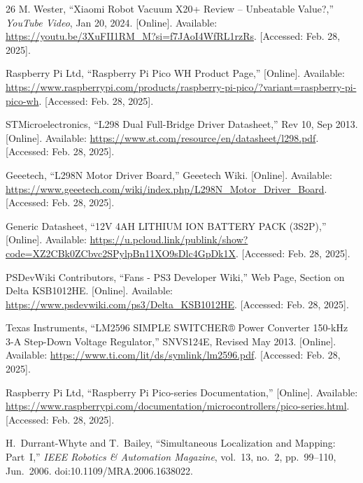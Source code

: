 \begin{thebibliography}{26}
M. Wester, ``Xiaomi Robot Vacuum X20+ Review -- Unbeatable Value?,'' \textit{YouTube Video}, Jan 20, 2024. [Online]. Available: \url{https://youtu.be/3XuFII1RM_M?si=f7JAoI4WfRL1rzRs}. [Accessed: Feb. 28, 2025].

Raspberry Pi Ltd, ``Raspberry Pi Pico WH Product Page,'' [Online]. Available: \url{https://www.raspberrypi.com/products/raspberry-pi-pico/?variant=raspberry-pi-pico-wh}. [Accessed: Feb. 28, 2025].

STMicroelectronics, ``L298 Dual Full-Bridge Driver Datasheet,'' Rev 10, Sep 2013. [Online]. Available: \url{https://www.st.com/resource/en/datasheet/l298.pdf}. [Accessed: Feb. 28, 2025].

Geeetech, ``L298N Motor Driver Board,'' Geeetech Wiki. [Online]. Available: \url{https://www.geeetech.com/wiki/index.php/L298N_Motor_Driver_Board}. [Accessed: Feb. 28, 2025].

Generic Datasheet, ``12V 4AH LITHIUM ION BATTERY PACK (3S2P),'' [Online]. Available: \url{https://u.pcloud.link/publink/show?code=XZ2CBk0ZCbvc2SPylpBn11XO9sDlc4GpDk1X}. [Accessed: Feb. 28, 2025].

PSDevWiki Contributors, ``Fans - PS3 Developer Wiki,'' Web Page, Section on Delta KSB1012HE. [Online]. Available: \url{https://www.psdevwiki.com/ps3/Delta_KSB1012HE}. [Accessed: Feb. 28, 2025].

Texas Instruments, ``LM2596 SIMPLE SWITCHER® Power Converter 150-kHz 3-A Step-Down Voltage Regulator,'' SNVS124E, Revised May 2013. [Online]. Available: \url{https://www.ti.com/lit/ds/symlink/lm2596.pdf}. [Accessed: Feb. 28, 2025].

Raspberry Pi Ltd, ``Raspberry Pi Pico-series Documentation,'' [Online]. Available: \url{https://www.raspberrypi.com/documentation/microcontrollers/pico-series.html}. [Accessed: Feb. 28, 2025].

H.~Durrant-Whyte and T.~Bailey,
``Simultaneous Localization and Mapping: Part~I,''
\textit{IEEE Robotics \& Automation Magazine}, vol.~13, no.~2, pp.~99--110, Jun.~2006.
doi:10.1109/MRA.2006.1638022.

\end{thebibliography}